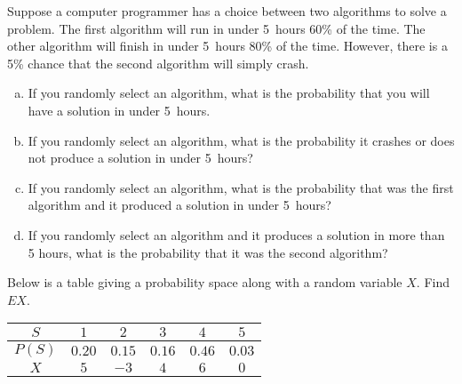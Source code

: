 \documentclass[11pt,letterpaper]{article}
\begin{document}
\newpage



 Suppose a computer programmer has a choice between two algorithms to solve a problem. The first algorithm will run in under 5~hours 60\% of the time. The other algorithm will finish in under 5~hours 80\% of the time. However, there is a 5\% chance that the second algorithm will simply crash. 
	\begin{enumerate}[(a)]
	\item If you randomly select an algorithm, what is the probability that you will have a solution in under 5~hours.
	\item If you randomly select an algorithm, what is the probability it crashes or does not produce a solution in under 5~hours?
	\item If you randomly select an algorithm, what is the probability that was the first algorithm and it produced a solution in under 5~hours?
	\item If you randomly select an algorithm and it produces a solution in more than 5 hours, what is the probability that it was the second algorithm?
	\end{enumerate}



\newpage



 Below is a table giving a probability space along with a random variable $X$. Find $EX$.
	\begin{table}[!ht]
	\centering
	\begin{tabular}{|c||c|c|c|c|c|} \hline
	$S$ & $1$ & $2$ & $3$ & $4$ & $5$ \\ \hline
	$P(S)$ & $0.20$ & $0.15$ & $0.16$ & $0.46$ & $0.03$ \\ \hline
	$X$ & $5$ & $-3$ & $4$ & $6$ & $0$ \\ \hline
	\end{tabular}
	\end{table}
\end{document}
